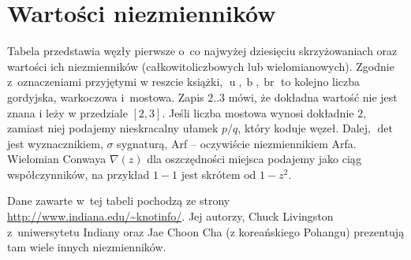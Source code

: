 \section{Wartości niezmienników}
\label{sec:table_of_invariants}
Tabela przedstawia węzły pierwsze o~co najwyżej dziesięciu skrzyżowaniach oraz wartości ich niezmienników (całkowitoliczbowych lub wielomianowych).
Zgodnie z~oznaczeniami przyjętymi w reszcie książki, $\operatorname{u}, \operatorname{b}, \operatorname{br}$ to kolejno liczba gordyjska, warkoczowa i~mostowa.
Zapis $2..3$ mówi, że dokładna wartość nie jest znana i leży w przedziale $[2,3]$.
Jeśli liczba mostowa wynosi dokładnie $2$, zamiast niej podajemy nieskracalny ułamek $p/q$, który koduje węzeł.
Dalej, $\det$ jest wyznacznikiem, $\sigma$ sygnaturą, Arf -- oczywiście niezmiennikiem Arfa.
Wielomian Conwaya $\nabla(z)$ dla oszczędności miejsca podajemy jako ciąg współczynników, na przykład $1-1$ jest skrótem od $1-z^2$.

Dane zawarte w~tej tabeli pochodzą ze strony \url{http://www.indiana.edu/~knotinfo/}.
Jej autorzy, Chuck Livingston z~uniwersytetu Indiany  oraz Jae Choon Cha (z koreańskiego Pohangu) prezentują tam wiele innych niezmienników.

